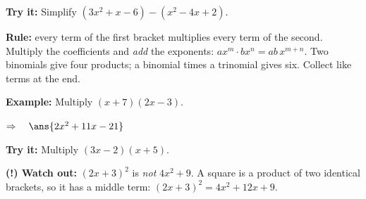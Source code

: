 \documentclass[12pt]{article}
\begin{document}
\begin{tryitbox}
\textbf{Try it:} \quad Simplify $(3x^2 + x - 6) - (x^2 - 4x + 2)$.\\[2pt]
\end{tryitbox}


\begin{formulabox}
\textbf{Rule:} every term of the first bracket multiplies every term of the second. Multiply the
coefficients and \emph{add} the exponents: $ax^m \cdot bx^n = ab\,x^{m+n}$. Two binomials give four
products; a binomial times a trinomial gives six. Collect like terms at the end.
\end{formulabox}

\begin{examplebox}
\textbf{Example:} \quad Multiply $(x + 7)(2x - 3)$.

$\Rightarrow\quad \ans{2x^2 + 11x - 21}$
\end{examplebox}

\begin{tryitbox}
\textbf{Try it:} \quad Multiply $(3x - 2)(x + 5)$.\\[2pt]
\end{tryitbox}

\begin{watchoutbox}
\textbf{(!) Watch out:} $(2x+3)^2$ is \emph{not} $4x^2 + 9$. A square is a product of two identical
brackets, so it has a middle term: $(2x+3)^2 = 4x^2 + 12x + 9$.
\end{watchoutbox}
\end{document}
